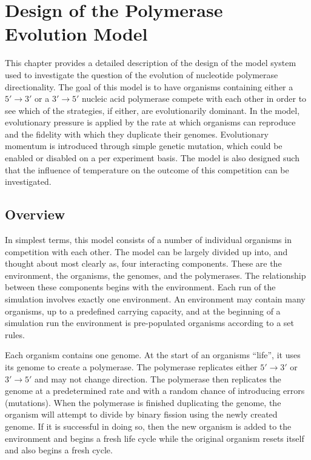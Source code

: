 \chapter{Design of the Polymerase Evolution Model} %
\label{cha:design_of_the_polymerase_evolution_model}
This chapter provides a detailed description of the design of the model system used to investigate the question of the evolution of nucleotide polymerase directionality. The goal of this model is to have organisms containing either a $5'\to3'$ or a $3'\to5'$ nucleic acid polymerase compete with each other in order to see which of the strategies, if either, are evolutionarily dominant. In the model, evolutionary pressure is applied by the rate at which organisms can reproduce and the fidelity with which they duplicate their genomes. Evolutionary momentum is introduced through simple genetic mutation, which could be enabled or disabled on a per experiment basis. The model is also designed such that the influence of temperature on the outcome of this competition can be investigated.

\section*{Overview} %
\label{sec:overview}
In simplest terms, this model consists of a number of individual organisms in competition with each other. The model can be largely divided up into, and thought about most clearly as, four interacting components. These are the environment, the organisms, the genomes, and the polymerases. The relationship between these components begins with the environment. Each run of the simulation involves exactly one environment. An environment may contain many organisms, up to a predefined carrying capacity, and at the beginning of a simulation run the environment is pre-populated organisms according to a set rules.

Each organism contains one genome. At the start of an organisms ``life'', it uses its genome to create a polymerase. The polymerase replicates either $5'\to3'$ or $3'\to5'$ and may not change direction. The polymerase then replicates the genome at a predetermined rate and with a random chance of introducing errors (mutations). When the polymerase is finished duplicating the genome, the organism will attempt to divide by binary fission using the newly created genome. If it is successful in doing so, then the new organism is added to the environment and begins a fresh life cycle while the original organism resets itself and also begins a fresh cycle.


